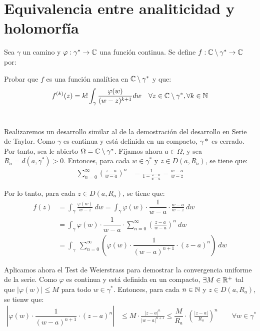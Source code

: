 \section{Equivalencia entre analiticidad y holomorfía}

\begin{ejercicio}
    Sea $\gamma$ un camino y $\varphi : \gamma^* \to \mathbb{C}$ una función continua. Se define $f : \mathbb{C}\setminus \gamma^* \to \mathbb{C}$ por:

    Probar que $f$ es una función analítica en $\mathbb{C}\setminus \gamma^*$ y que:
    \begin{equation*}
        f^{(k)}(z) = k! \int_{\gamma} \frac{\varphi(w)}{(w-z)^{k+1}}dw \quad \forall z \in \mathbb{C}\setminus \gamma^*, \forall k \in \mathbb{N}
    \end{equation*}~

    Realizaremos un desarrollo similar al de la demostración del desarrollo en Serie de Taylor. Como $\gamma$ es continua y está definida en un compacto, $\gamma*$ es cerrado. Por tanto, sea le abierto $\Omega=\mathbb{C}\setminus \gamma^*$. Fijamos ahora $a\in \Omega$, y sea $R_a=d(a,\gamma^*)>0$. Entonces, para cada $w\in \gamma^*$ y $z\in D(a,R_a)$, se tiene que:
    \begin{align*}
        \sum_{n=0}^{\infty} \left(\frac{z-a}{w-a}\right)^n &= \frac{1}{1-\frac{z-a}{w-a}} = \frac{w-a}{w-z}
    \end{align*}

    Por lo tanto, para cada $z\in D(a,R_a)$, se tiene que:
    \begin{align*}
        f(z) &= \int_{\gamma} \frac{\varphi(w)}{w-z}\ dw = \int_{\gamma} \varphi(w)\cdot \dfrac{1}{w-a}\cdot \frac{w-a}{w-z}\ dw \\
        &= \int_{\gamma} \varphi(w)\cdot \dfrac{1}{w-a}\cdot \sum_{n=0}^{\infty} \left(\frac{z-a}{w-a}\right)^n\ dw \\
        &= \int_{\gamma}\ \sum_{n=0}^{\infty} \left(\varphi(w)\cdot \dfrac{1}{(w-a)^{n+1}}\cdot (z-a)^n\right)\ dw 
    \end{align*}

    Aplicamos ahora el Test de Weierstrass para demostrar la convergencia uniforme de la serie. Como $\varphi$ es continua y está definida en un compacto, $\exists M\in \mathbb{R}^+$ tal que $|\varphi(w)|\leq M$ para todo $w\in \gamma^*$. Entonces, para cada $n\in \mathbb{N}$ y $z\in D(a,R_a)$, se tienw que:
    \begin{align*}
        \left|\varphi(w)\cdot \dfrac{1}{(w-a)^{n+1}}\cdot (z-a)^n\right| &\leq M\cdot \frac{|z-a|^n}{|w-a|^{n+1}}
        \leq \dfrac{M}{R_a} \cdot \left(\frac{|z-a|}{R_a}\right)^n \qquad \forall w\in \gamma^*
    \end{align*}


\end{ejercicio}
